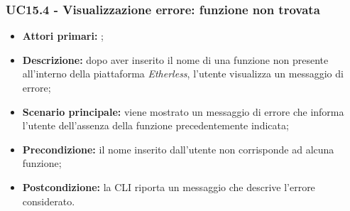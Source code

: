 \subsubsection{UC15.4 - Visualizzazione errore: funzione non trovata}
\begin{itemize}
	\item \textbf{Attori primari:} \us{};
	\item \textbf{Descrizione:} dopo aver inserito il nome di una funzione non presente all’interno della piattaforma \textit{Etherless}, l’utente visualizza un messaggio di errore; 
	\item \textbf{Scenario principale:} viene mostrato un messaggio di errore che informa l’utente dell’assenza della funzione precedentemente indicata;  
	\item \textbf{Precondizione:} il nome inserito dall’utente non corrisponde ad alcuna funzione;
	\item \textbf{Postcondizione:} la CLI riporta un messaggio che descrive l’errore considerato. 
\end{itemize}